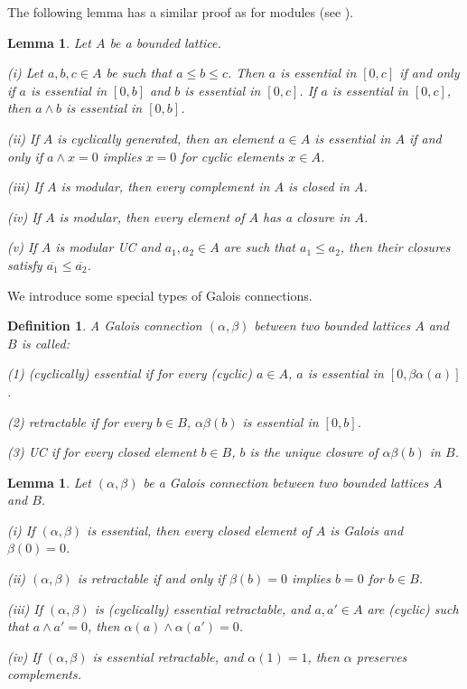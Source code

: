 \documentclass[11pt,a4paper]{amsart}
\newtheorem{lem}[theorem]{Lemma}
\newtheorem{defn}[theorem]{Definition}
\begin{document}
The following lemma has a similar proof as for modules (see \cite{DHSW, GP}). 

\begin{lem} \label{l:ess} Let $A$ be a bounded lattice.

(i) Let $a,b,c\in A$ be such that $a\leq b\leq c$. Then $a$ is essential in $[0,c]$ if and only if $a$ is
essential in $[0,b]$ and $b$ is essential in $[0,c]$. If $a$ is essential in $[0,c]$, then $a\wedge b$ is essential in
$[0,b]$.

(ii) If $A$ is cyclically generated, then an element $a\in A$ is essential in $A$ if and only if $a\wedge x=0$ implies
$x=0$ for cyclic elements $x\in A$.

(iii) If $A$ is modular, then every complement in $A$ is closed in $A$.

(iv) If $A$ is modular, then every element of $A$ has a closure in $A$. 

(v) If $A$ is modular UC and $a_1,a_2\in A$ are such that $a_1\leq a_2$, then their closures satisfy
$\overline{a_1}\leq \overline{a_2}$.  
\end{lem}

We introduce some special types of Galois connections.

\begin{defn} \rm A Galois connection $(\alpha,\beta)$ between two bounded lattices $A$ and $B$ is called: 

(1) {\it (cyclically) essential} if for every (cyclic) $a\in A$, $a$ is essential in $[0,\beta\alpha(a)]$.

(2) {\it retractable} if for every $b \in B$, $\alpha\beta(b)$ is essential in $[0,b]$.

(3) {\it UC} if for every closed element $b\in B$, $b$ is the unique closure of $\alpha\beta(b)$ in $B$. 
\end{defn}

\begin{lem} \label{l:clgal} Let $(\alpha,\beta)$ be a Galois connection between two bounded lattices $A$ and $B$.

(i) If $(\alpha,\beta)$ is essential, then every closed element of $A$ is Galois and $\beta(0)=0$. 

(ii) $(\alpha,\beta)$ is retractable if and only if $\beta(b)=0$ implies $b=0$ for $b\in B$. 

(iii) If $(\alpha,\beta)$ is (cyclically) essential retractable, and $a,a'\in A$ are (cyclic) such that $a\wedge a'=0$,
then $\alpha(a)\wedge \alpha(a')=0$. 

(iv) If $(\alpha,\beta)$ is essential retractable, and $\alpha(1)=1$, then $\alpha$ preserves complements.
\end{lem}
\end{document}

